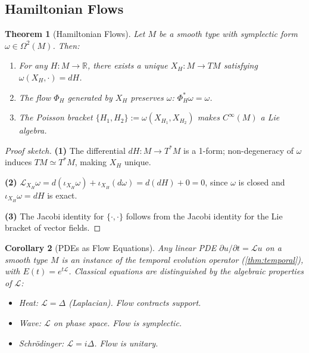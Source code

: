 \documentclass[11pt,a4paper]{article}
\theoremstyle{plain}
\newtheorem{theorem}{Theorem}[section]
\newtheorem{corollary}[theorem]{Corollary}
\theoremstyle{definition}
\theoremstyle{remark}
\newcommand{\R}{\mathbb{R}}
\begin{document}
\subsection{Hamiltonian Flows}

\begin{theorem}[Hamiltonian Flows]
\label{thm:hamiltonian}
Let $M$ be a smooth type with symplectic form $\omega \in \Omega^2(M)$.
Then:
\begin{enumerate}[nosep]
    \item For any $H : M \to \R$, there exists a unique $X_H : M \to TM$ satisfying $\omega(X_H, \cdot) = dH$.
    \item The flow $\Phi_H$ generated by $X_H$ preserves $\omega$: $\Phi_H^*\omega = \omega$.
    \item The Poisson bracket $\{H_1, H_2\} := \omega(X_{H_1}, X_{H_2})$ makes $C^\infty(M)$ a Lie algebra.
\end{enumerate}
\end{theorem}

\begin{proof}[Proof sketch]
\textbf{(1)} The differential $dH : M \to T^*M$ is a 1-form; non-degeneracy of $\omega$ induces $TM \simeq T^*M$, making $X_H$ unique.

\textbf{(2)} $\mathcal{L}_{X_H}\omega = d(\iota_{X_H}\omega) + \iota_{X_H}(d\omega) = d(dH) + 0 = 0$, since $\omega$ is closed and $\iota_{X_H}\omega = dH$ is exact.

\textbf{(3)} The Jacobi identity for $\{\cdot, \cdot\}$ follows from the Jacobi identity for the Lie bracket of vector fields.
\end{proof}

\begin{corollary}[PDEs as Flow Equations]
\label{cor:pde}
Any linear PDE $\partial u / \partial t = \mathcal{L}u$ on a smooth type $M$ is an instance of the temporal evolution operator (\cref{thm:temporal}), with $E(t) = e^{t\mathcal{L}}$.
Classical equations are distinguished by the algebraic properties of $\mathcal{L}$:
\begin{itemize}[nosep]
    \item Heat: $\mathcal{L} = \Delta$ (Laplacian). Flow contracts support.
    \item Wave: $\mathcal{L}$ on phase space. Flow is symplectic.
    \item Schr\"odinger: $\mathcal{L} = i\Delta$. Flow is unitary.
\end{itemize}
\end{corollary}
\end{document}
